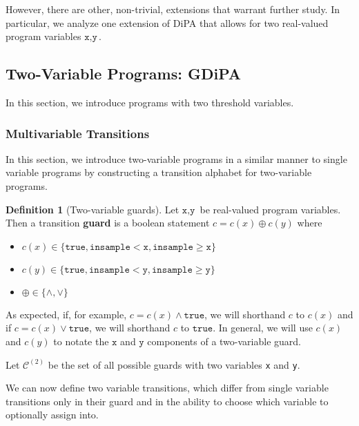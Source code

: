 \documentclass[12pt]{article}
\newcommand{\gguard}[1][x]{\texttt{insample}\geq#1}
\newcommand{\lguard}[1][x]{\texttt{insample} < #1}
\theoremstyle{definition}
\newtheorem{defn}[thm]{Definition}
\begin{document}
However, there are other, non-trivial, extensions that warrant further study. In particular, we analyze one extension of DiPA that allows for two real-valued program variables $\texttt{x}, \texttt{y}$.

\subsection{Two-Variable Programs: GDiPA}

In this section, we introduce programs with two threshold variables.  

\subsubsection{Multivariable Transitions}

In this section, we introduce two-variable programs in a similar manner to single variable programs by constructing a transition alphabet for two-variable programs.

\begin{defn}[Two-variable guards]
    Let $\texttt{x}, \texttt{y}$ be real-valued program variables. Then a transition \textbf{guard} is a boolean statement $c = c(x)\oplus c(y)$ where \begin{itemize}
        \item $c(x)\in \{\texttt{true}, \lguard[\texttt{x}], \gguard[\texttt{x}]\}$
        \item $c(y)\in \{\texttt{true}, \lguard[\texttt{y}], \gguard[\texttt{y}]\}$
        \item $\oplus \in \{\land, \lor\}$
    \end{itemize}
    As expected, if, for example, $c = c(x) \land \texttt{true}$, we will shorthand $c$ to $c(x)$ and if $c = c(x)\lor \texttt{true}$, we will shorthand $c$ to $\texttt{true}$. In general, we will use $c(x)$ and $c(y)$ to notate the $\texttt{x}$ and $\texttt{y}$ components of a two-variable guard. 

    Let $\mathcal{C}^{(2)}$ be the set of all possible guards with two variables \texttt{x} and \texttt{y}.
\end{defn}

We can now define two variable transitions, which differ from single variable transitions only in their guard and in the ability to choose which variable to optionally assign into. 
\end{document}
